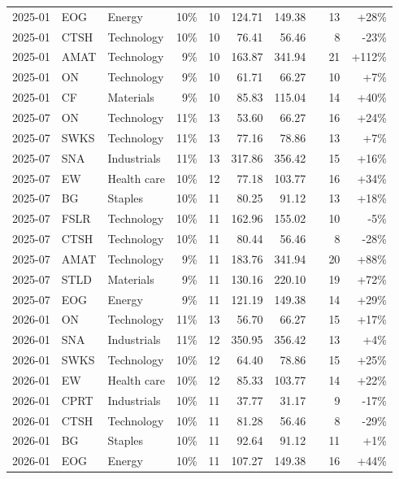 \documentclass[11pt,a4paper]{article}
\begin{document}
{\begin{longtable}{l l l r r r r r r r}
2025-01 & EOG & Energy & 10\% & 10 & 124.71 & 149.38 &  & 13 & +28\% \\
2025-01 & CTSH & Technology & 10\% & 10 & 76.41 & 56.46 &  & 8 & -23\% \\
2025-01 & AMAT & Technology & 9\% & 10 & 163.87 & 341.94 &  & 21 & +112\% \\
2025-01 & ON & Technology & 9\% & 10 & 61.71 & 66.27 &  & 10 & +7\% \\
2025-01 & CF & Materials & 9\% & 10 & 85.83 & 115.04 &  & 14 & +40\% \\
2025-07 & ON & Technology & 11\% & 13 & 53.60 & 66.27 &  & 16 & +24\% \\
2025-07 & SWKS & Technology & 11\% & 13 & 77.16 & 78.86 &  & 13 & +7\% \\
2025-07 & SNA & Industrials & 11\% & 13 & 317.86 & 356.42 &  & 15 & +16\% \\
2025-07 & EW & Health care & 10\% & 12 & 77.18 & 103.77 &  & 16 & +34\% \\
2025-07 & BG & Staples & 10\% & 11 & 80.25 & 91.12 &  & 13 & +18\% \\
2025-07 & FSLR & Technology & 10\% & 11 & 162.96 & 155.02 &  & 10 & -5\% \\
2025-07 & CTSH & Technology & 10\% & 11 & 80.44 & 56.46 &  & 8 & -28\% \\
2025-07 & AMAT & Technology & 9\% & 11 & 183.76 & 341.94 &  & 20 & +88\% \\
2025-07 & STLD & Materials & 9\% & 11 & 130.16 & 220.10 &  & 19 & +72\% \\
2025-07 & EOG & Energy & 9\% & 11 & 121.19 & 149.38 &  & 14 & +29\% \\
2026-01 & ON & Technology & 11\% & 13 & 56.70 & 66.27 &  & 15 & +17\% \\
2026-01 & SNA & Industrials & 11\% & 12 & 350.95 & 356.42 &  & 13 & +4\% \\
2026-01 & SWKS & Technology & 10\% & 12 & 64.40 & 78.86 &  & 15 & +25\% \\
2026-01 & EW & Health care & 10\% & 12 & 85.33 & 103.77 &  & 14 & +22\% \\
2026-01 & CPRT & Industrials & 10\% & 11 & 37.77 & 31.17 &  & 9 & -17\% \\
2026-01 & CTSH & Technology & 10\% & 11 & 81.28 & 56.46 &  & 8 & -29\% \\
2026-01 & BG & Staples & 10\% & 11 & 92.64 & 91.12 &  & 11 & +1\% \\
2026-01 & EOG & Energy & 10\% & 11 & 107.27 & 149.38 &  & 16 & +44\% \\

\end{longtable}}
\end{document}
